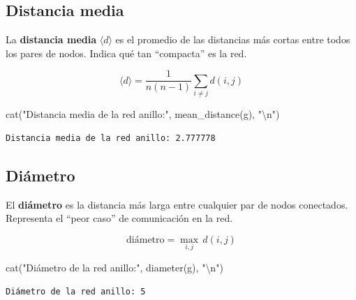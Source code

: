 \documentclass[
  letterpaper,
  DIV=11,
  numbers=noendperiod]{scrreprt}
\newenvironment{Shaded}{\begin{snugshade}}{\end{snugshade}}
\newcommand{\AttributeTok}[1]{\textcolor[rgb]{0.40,0.45,0.13}{#1}}
\newcommand{\CommentTok}[1]{\textcolor[rgb]{0.37,0.37,0.37}{#1}}
\newcommand{\FunctionTok}[1]{\textcolor[rgb]{0.28,0.35,0.67}{#1}}
\newcommand{\NormalTok}[1]{\textcolor[rgb]{0.00,0.23,0.31}{#1}}
\newcommand{\OtherTok}[1]{\textcolor[rgb]{0.00,0.23,0.31}{#1}}
\newcommand{\SpecialCharTok}[1]{\textcolor[rgb]{0.37,0.37,0.37}{#1}}
\newcommand{\StringTok}[1]{\textcolor[rgb]{0.13,0.47,0.30}{#1}}
\begin{document}
\subsection{Distancia media}\label{distancia-media}

La \textbf{distancia media} \(\langle d \rangle\) es el promedio de las
distancias más cortas entre todos los pares de nodos. Indica qué tan
``compacta'' es la red.

\[
\langle d \rangle = \frac{1}{n(n-1)} \sum_{i \neq j} d(i, j)
\]

\begin{Shaded}
\begin{Highlighting}[]
\FunctionTok{cat}\NormalTok{(}\StringTok{"Distancia media de la red anillo:"}\NormalTok{, }\FunctionTok{mean\_distance}\NormalTok{(g), }\StringTok{"}\SpecialCharTok{\textbackslash{}n}\StringTok{"}\NormalTok{)}
\end{Highlighting}
\end{Shaded}

\begin{verbatim}
Distancia media de la red anillo: 2.777778 
\end{verbatim}

\subsection{Diámetro}\label{diuxe1metro}

El \textbf{diámetro} es la distancia más larga entre cualquier par de
nodos conectados. Representa el ``peor caso'' de comunicación en la red.

\[
\text{diámetro} = \max_{i,j} \, d(i, j)
\]

\begin{Shaded}
\begin{Highlighting}[]
\FunctionTok{cat}\NormalTok{(}\StringTok{"Diámetro de la red anillo:"}\NormalTok{, }\FunctionTok{diameter}\NormalTok{(g), }\StringTok{"}\SpecialCharTok{\textbackslash{}n}\StringTok{"}\NormalTok{)}
\end{Highlighting}
\end{Shaded}

\begin{verbatim}
Diámetro de la red anillo: 5 
\end{verbatim}

\begin{Shaded}
\end{Shaded}
\end{document}

